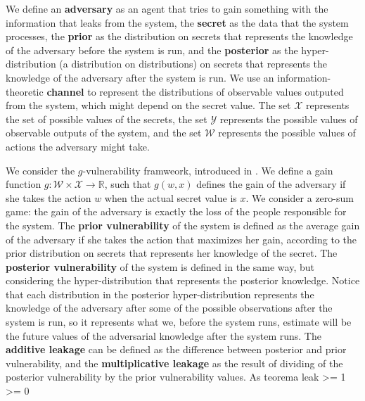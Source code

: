 We define an \textbf{adversary} as an agent that tries to gain something with the information that leaks from the system, the \textbf{secret} as the data that the system processes, the \textbf{prior} as the distribution on secrets that represents the knowledge of the adversary before the system is run, and the \textbf{posterior} as the hyper-distribution (a distribution on distributions) on secrets that represents the knowledge of the adversary after the system is run. We use an information-theoretic \textbf{channel} to represent the distributions of observable values outputed from the system, which might depend on the secret value. The set $\mathcal{X}$ represents the set of possible values of the secrets, the set $\mathcal{Y}$ represents the possible values of observable outputs of the system, and the set $\mathcal{W}$ represents the possible values of actions the adversary might take.

We consider the $g$-vulnerability framweork, introduced in \cite{QIF}. We define a gain function $g : \mathcal{W} \times \mathcal{X} \rightarrow \mathbb{R}$, such that $g(w,x)$ defines the gain of the adversary if she takes the action $w$ when the actual secret value is $x$. We consider a zero-sum game: the gain of the adversary is exactly the loss of the people responsible for the system. The \textbf{prior vulnerability} of the system is defined as the average gain of the adversary if she takes the action that maximizes her gain, according to the prior distribution on secrets that represents her knowledge of the secret. The \textbf{posterior vulnerability} of the system is defined in the same way, but considering the hyper-distribution that represents the posterior knowledge. Notice that each distribution in the posterior hyper-distribution represents the knowledge of the adversary after some of the possible observations after the system is run, so it represents what we, before the system runs, estimate will be the future values of the adversarial knowledge after the system runs. The \textbf{additive leakage} can be defined as the difference between posterior and prior vulnerability, and the \textbf{multiplicative leakage} as the result of dividing of the posterior vulnerability by the prior vulnerability values. As teorema leak >= 1 >= 0

